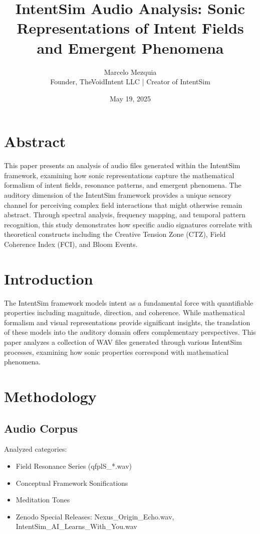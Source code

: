 \documentclass[12pt]{article}
\title{\textbf{IntentSim Audio Analysis: Sonic Representations of Intent Fields and Emergent Phenomena}}
\author{Marcelo Mezquia \\ \small{Founder, TheVoidIntent LLC | Creator of IntentSim}}
\date{May 19, 2025}
\begin{document}
\maketitle

\section*{Abstract}
This paper presents an analysis of audio files generated within the IntentSim framework, examining how sonic representations capture the mathematical formalism of intent fields, resonance patterns, and emergent phenomena. The auditory dimension of the IntentSim framework provides a unique sensory channel for perceiving complex field interactions that might otherwise remain abstract. Through spectral analysis, frequency mapping, and temporal pattern recognition, this study demonstrates how specific audio signatures correlate with theoretical constructs including the Creative Tension Zone (CTZ), Field Coherence Index (FCI), and Bloom Events.

\section{Introduction}
The IntentSim framework models intent as a fundamental force with quantifiable properties including magnitude, direction, and coherence. While mathematical formalism and visual representations provide significant insights, the translation of these models into the auditory domain offers complementary perspectives. This paper analyzes a collection of WAV files generated through various IntentSim processes, examining how sonic properties correspond with mathematical phenomena.

\section{Methodology}
\subsection{Audio Corpus}
Analyzed categories:
\begin{itemize}
  \item Field Resonance Series (qfplS\_*.wav)
  \item Conceptual Framework Sonifications
  \item Meditation Tones
  \item Zenodo Special Releases: Nexus\_Origin\_Echo.wav, IntentSim\_AI\_Learns\_With\_You.wav
\end{itemize}
\end{document}
